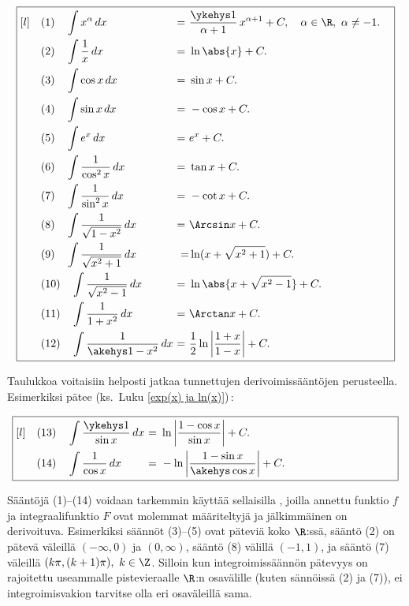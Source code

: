 \[ \boxed{\begin{alignedat}[l]{2} \quad
&(1)  \quad \int x^\alpha\,dx & \ = \ 
     & \frac{\ykehys 1}{\alpha +1}\,x^{\alpha+1}+C,\quad \alpha\in\R, \ \alpha\neq -1. \quad \\
&(2)  \quad \int \frac{1}{x}\,dx & \ = \ &\ln\abs{x}+C. \\
&(3)  \quad \int \cos x\,dx & \ = \ & \sin x+C. \\
&(4)  \quad \int \sin x\,dx & \ = \ & -\cos x+C. \\
&(5)  \quad \int e^x \, dx & \ = \ & e^x+C. \\
&(6)  \quad \int \frac{1}{\cos^2 x}\,dx & \ = \ & \tan x+C. \\
&(7)  \quad \int \frac{1}{\sin^2 x}\,dx & \ = \ & -\cot x+C. \\
&(8)  \quad \int \frac{1}{\sqrt{1-x^2}}\,dx & \ = \ & \Arcsin x+C. \\
&(9)  \quad \int \frac{1}{\sqrt{x^2+1}}\,dx & \ = & \ln(x+\sqrt{x^2+1})+C. \quad \\
&(10) \quad \int \frac{1}{\sqrt{x^2-1}}\,dx & \ = \ & \ln\abs{x+\sqrt{x^2-1}}+C. \\
&(11) \quad \int \frac{1}{1+x^2}\,dx & \ = \ & \Arctan x+C. \\
&(12) \quad \int \frac{1}{\akehys 1-x^2}\,dx  & \ = \ & 
                 \frac{1}{2}\ln\left|\frac{1+x}{1-x}\right|+C.
\end{alignedat}} \]

Taulukkoa voitaisiin helposti jatkaa tunnettujen derivoimissääntöjen perusteella. Esimerkiksi
pätee (ks.\ Luku \ref{exp(x) ja ln(x)})\,:

\[ \boxed{\begin{alignedat}[l]{2} \quad
&(13) \quad \int\dfrac{\ykehys 1}{\sin x}\,dx & \ = \ & 
                     \ln\left|\dfrac{1-\cos x}{\sin x}\right|+C. \\
&(14) \quad \int\dfrac{1}{\cos x}\,dx & \ = \ & 
                    -\ln\left|\dfrac{1-\sin x}{\akehys\cos x}\right|+C. \hspace{35mm}
\end{alignedat}} \]

Sääntöjä (1)--(14) voidaan tarkemmin käyttää sellaisilla  ,
joilla annettu funktio $f$ ja integraalifunktio $F$ ovat molemmat määriteltyjä ja jälkimmäinen
on derivoituva. Esimerkiksi säännöt (3)--(5) ovat päteviä koko $\R$:ssä, sääntö (2) on pätevä 
väleillä $(-\infty,0)$ ja $(0,\infty)$, sääntö (8) välillä $(-1,1)$, ja sääntö (7) väleillä
$(k\pi,(k+1)\pi),\ k\in\Z$. Silloin kun integroimissäännön pätevyys on rajoitettu useammalle
pistevieraalle $\R$:n osavälille (kuten sännöissä (2) ja (7)), ei integroimisvakion tarvitse
olla eri osaväleillä sama.

